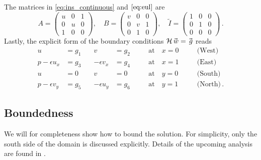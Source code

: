 The matrices in \eqref{eq:ins_continuous} and $\eqref{eq:eul}$ are 
\[
   A = 
   \begin{pmatrix}
      u & 0 & 1
      \\
      0 & u & 0
      \\
      1 & 0 & 0
   \end{pmatrix}
   , \quad 
   B = 
   \begin{pmatrix}
      v & 0 & 0
      \\
      0 & v & 1
      \\
      0 & 1 & 0
   \end{pmatrix}
   ,\quad 
   \tilde{I} = 
   \begin{pmatrix}
      1 & 0 & 0
      \\
      0 & 1 & 0
      \\
      0 & 0 & 0
   \end{pmatrix}
   \, .
\]
Lastly, the explicit form of the boundary conditions $\mathcal{H}\w = \g$ reads
\begin{equation}
\begin{aligned}
  u & = g_1 \quad & v & = g_2  & \quad & \text{at}  \quad x = 0 \quad && \text{(West)}
  \\
  p - \epsilon u_x & = g_3 \quad & -\epsilon v_x & = g_4 & \quad & \text{at} \quad x = 1  \quad && \text{(East)}
  \\
  u &= 0 \quad & v &= 0        & \quad & \text{at}  \quad y = 0 \quad && \text{(South)}
  \\
  p-\epsilon v_y &= g_5 \quad & -\epsilon u_y &= g_6        & \quad & \text{at}  \quad y = 1 \quad && \text{(North)}
  \, .
\label{eq:boundary_conditions}
\end{aligned}
\end{equation}

\subsection{Boundedness}
We will for completeness show how to bound the solution. For simplicity, only the south side of the domain is discussed explicitly. Details of the upcoming analysis are found in \cite{nordstrom2019energy}. 

